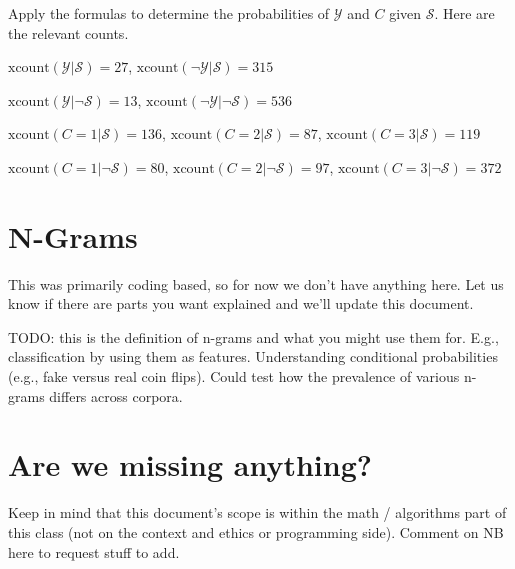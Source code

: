 \documentclass{tufte-handout}
\begin{document}
\begin{exercise}
Apply the formulas to determine the probabilities of $\mathcal{Y}$ and $C$ given $\mathcal{S}$.  Here are the relevant counts.

\bi
\item $\mbox{xcount}(\mathcal{Y}|  \mathcal{S}) = 27$,  $\mbox{xcount}(\neg \mathcal{Y}|  \mathcal{S}) = 315$
\item $\mbox{xcount}(\mathcal{Y}| \neg \mathcal{S}) = 13$,  $\mbox{xcount}(\neg \mathcal{Y}| \neg \mathcal{S}) = 536$
\item $\mbox{xcount}(C=1 | \mathcal{S}) = 136$, $\mbox{xcount}(C=2 | \mathcal{S}) = 87$, $\mbox{xcount}(C=3 | \mathcal{S}) = 119$
\item $\mbox{xcount}(C=1 | \neg \mathcal{S}) = 80$, $\mbox{xcount}(C=2 | \neg \mathcal{S}) = 97$, $\mbox{xcount}(C=3 | \neg \mathcal{S}) = 372$
\ei

\end{exercise}

\ei



\section{N-Grams}
This was primarily coding based, so for now we don't have anything here.  Let us know if there are parts you want explained and we'll update this document.

TODO: this is the definition of n-grams and what you might use them for.  E.g., classification by using them as features.  Understanding conditional probabilities (e.g., fake versus real coin flips).  Could test how the prevalence of various n-grams differs across corpora.

\section{Are we missing anything?}
Keep in mind that this document's scope is within the math / algorithms part of this class (not on the context and ethics or programming side).  Comment on NB here to request stuff to add. 
\end{document}
